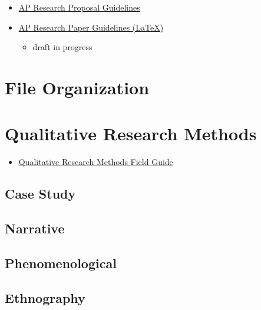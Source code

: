 \documentclass[]{book}
\providecommand{\tightlist}{%
  \setlength{\itemsep}{0pt}\setlength{\parskip}{0pt}}
\begin{document}
\begin{itemize}
\tightlist
\item
  \href{https://www.overleaf.com/read/ncvzdvcvfxdx}{AP Research Proposal Guidelines}
\item
  \href{https://www.overleaf.com/read/hxctjpdnvffw}{AP Research Paper Guidelines (LaTeX)}

  \begin{itemize}
  \tightlist
  \item
    draft in progress
  \end{itemize}
\end{itemize}

\hypertarget{file-organization}{%
\chapter{File Organization}\label{file-organization}}

\hypertarget{qualmethods}{%
\chapter{Qualitative Research Methods}\label{qualmethods}}

\begin{itemize}
\tightlist
\item
  \href{https://course.ccs.neu.edu/is4800sp12/resources/qualmethods.pdf}{Qualitative Research Methods Field Guide}
\end{itemize}

\hypertarget{case-study}{%
\section{Case Study}\label{case-study}}

\hypertarget{narrative}{%
\section{Narrative}\label{narrative}}

\hypertarget{phenomenological}{%
\section{Phenomenological}\label{phenomenological}}

\hypertarget{ethnography}{%
\section{Ethnography}\label{ethnography}}
\end{document}
